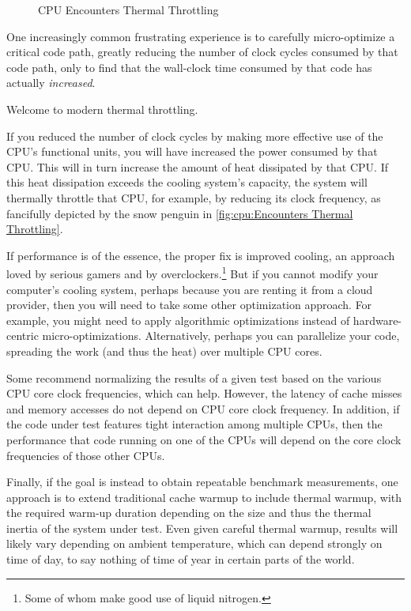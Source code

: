 \begin{figure}
\centering
{}
\caption{CPU Encounters Thermal Throttling}
\end{figure}

One increasingly common frustrating experience is to carefully
micro-optimize a critical code path, greatly reducing the number of
clock cycles consumed by that code path, only to find that the
wall-clock time consumed by that code has actually \emph{increased}.

Welcome to modern thermal throttling.

If you reduced the number of clock cycles by making more effective
use of the CPU's functional units, you will have increased the
power consumed by that CPU\@.
This will in turn increase the amount of heat dissipated by that CPU\@.
If this heat dissipation exceeds the cooling system's capacity, the
system will thermally throttle that CPU, for example, by reducing
its clock frequency, as fancifully depicted by the snow penguin in
\cref{fig:cpu:Encounters Thermal Throttling}.

If performance is of the essence, the proper fix is improved cooling,
an approach loved by serious gamers and by overclockers.\footnote{
	Some of whom make good use of liquid nitrogen.}
But if you cannot modify your computer's cooling system, perhaps because
you are renting it from a cloud provider, then you will need to take
some other optimization approach.
For example, you might need to apply algorithmic optimizations instead
of hardware-centric micro-optimizations.
Alternatively, perhaps you can parallelize your code, spreading the
work (and thus the heat) over multiple CPU cores.

Some recommend normalizing the results of a given test based on
the various CPU core clock frequencies, which can help.
However, the latency of cache misses and memory accesses do not
depend on CPU core clock frequency.
In addition, if the code under test features tight interaction among
multiple CPUs, then the performance that code running on one of the CPUs
will depend on the core clock frequencies of those other CPUs.

Finally, if the goal is instead to obtain repeatable benchmark
measurements, one approach is to extend traditional cache warmup to
include thermal warmup, with the required warm-up duration depending on
the size and thus the thermal inertia of the system under test.
Even given careful thermal warmup, results will likely vary depending
on ambient temperature, which can depend strongly on time of day, to
say nothing of time of year in certain parts of the world.

